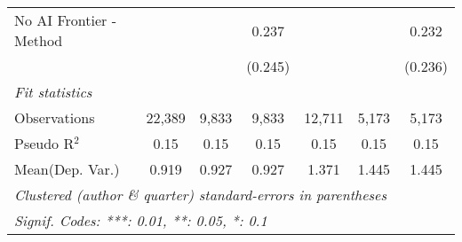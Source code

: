 \begin{tabular}{lcccccc}
   No AI Frontier - Method &               &               & 0.237        &               &              & 0.232\\   
                           &               &               & (0.245)      &               &              & (0.236)\\   
   \midrule
   \emph{Fit statistics}\\
   Observations            & 22,389        & 9,833         & 9,833        & 12,711        & 5,173        & 5,173\\  
   Pseudo R$^2$            & 0.15          & 0.15          & 0.15         & 0.15          & 0.15         & 0.15\\  
Mean(Dep. Var.) & 0.919 & 0.927 & 0.927 & 1.371 & 1.445 & 1.445 \\
   \midrule \midrule
   \multicolumn{7}{l}{\emph{Clustered (author \& quarter) standard-errors in parentheses}}\\
   \multicolumn{7}{l}{\emph{Signif. Codes: ***: 0.01, **: 0.05, *: 0.1}}\\
\end{tabular}
\par\endgroup
